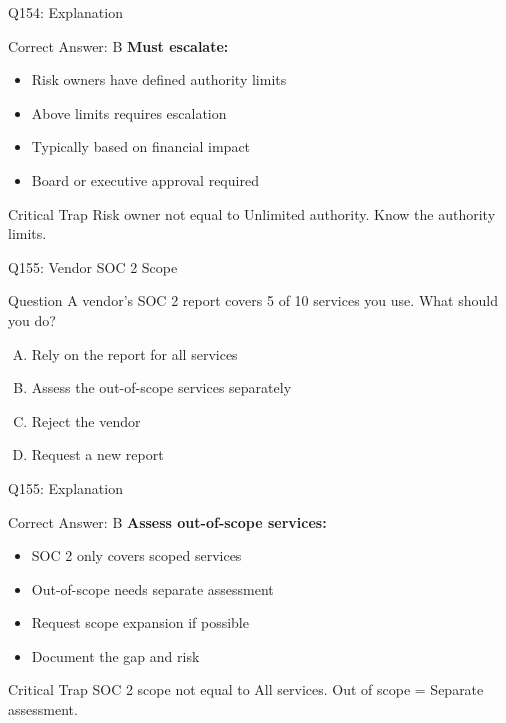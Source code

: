 \documentclass{beamer}
\begin{document}
	\begin{frame}{Q154: Explanation}
		\begin{block}{Correct Answer: B}
			\textbf{Must escalate:}
			\begin{itemize}
				\item Risk owners have defined authority limits
				\item Above limits requires escalation
				\item Typically based on financial impact
				\item Board or executive approval required
			\end{itemize}
		\end{block}
		\begin{alertblock}{Critical Trap}
			Risk owner not equal to Unlimited authority.
			Know the authority limits.
		\end{alertblock}
	\end{frame}
	
	\begin{frame}{Q155: Vendor SOC 2 Scope}
		\begin{block}{Question}
			A vendor's SOC 2 report covers 5 of 10 services you use. What should you do?
		\end{block}
		\begin{enumerate}[(A)]
			\item Rely on the report for all services
			\item Assess the out-of-scope services separately
			\item Reject the vendor
			\item Request a new report
		\end{enumerate}
	\end{frame}
	
	\begin{frame}{Q155: Explanation}
		\begin{block}{Correct Answer: B}
			\textbf{Assess out-of-scope services:}
			\begin{itemize}
				\item SOC 2 only covers scoped services
				\item Out-of-scope needs separate assessment
				\item Request scope expansion if possible
				\item Document the gap and risk
			\end{itemize}
		\end{block}
		\begin{alertblock}{Critical Trap}
			SOC 2 scope not equal to All services.
			Out of scope = Separate assessment.
		\end{alertblock}
	\end{frame}
	
\end{document}
